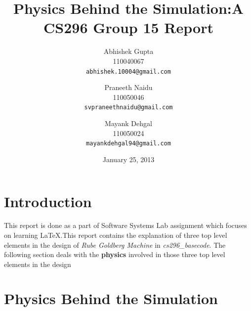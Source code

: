 \documentclass[11]{article}
\begin{document}
\title{Physics Behind the Simulation:A CS296 Group 15 Report}
\author{Abhishek Gupta\\
110040067\\
\texttt{abhishek.10004@gmail.com}\\
\and Praneeth Naidu\\
110050046\\
\texttt{svpraneethnaidu@gmail.com}\\
\and Mayank Dehgal\\
110050024\\
\texttt{mayankdehgal94@gmail.com}}
\date{January 25, 2013}
\maketitle

\section{Introduction}
This report is done as a part of Software Systems Lab assignment which focuses on learning\cite{webTut} LaTeX.This report contains the explanation of three top level elements in the design of \emph{Rube Goldberg Machine} in \emph{cs296\_basecode}. The following section deals with the \textbf{physics} involved in those three top level elements in the design

\section{Physics Behind the Simulation}
\end{document}
